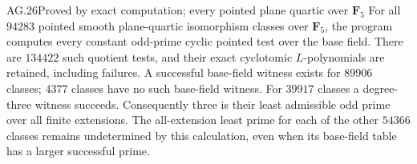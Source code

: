 \begin{claim}{AG.26}{Proved by exact computation; every pointed plane quartic over $\mathbf F_5$}
For all $94283$ pointed smooth plane-quartic isomorphism
classes over $\mathbf F_5$, the program
 computes every constant
odd-prime cyclic pointed test over the base field.
There are $134422$ such quotient tests, and their exact
cyclotomic $L$-polynomials are retained, including failures.
A successful base-field witness exists for $89906$ classes;
$4377$ classes have no such base-field witness.
For $39917$ classes a degree-three witness succeeds.
Consequently three is their least admissible odd prime
over all finite extensions. The all-extension least prime
for each of the other $54366$ classes remains undetermined
by this calculation, even when its base-field table has
a larger successful prime.
\end{claim}
